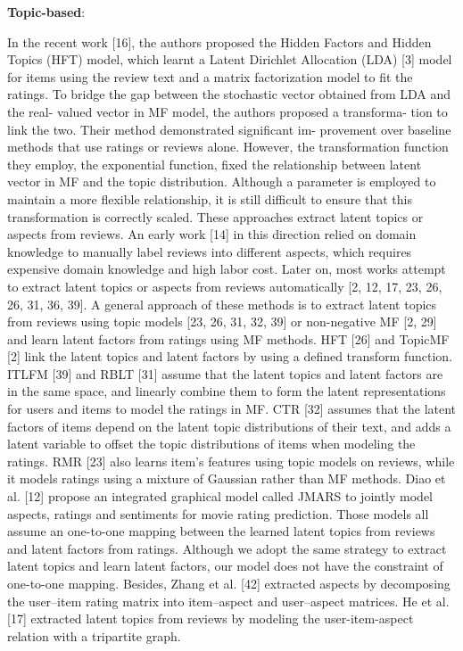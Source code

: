 \documentclass[10pt,conference]{IEEEtran}
\begin{document}
\textbf{Topic-based}: 

In the recent work [16], the authors proposed the Hidden Factors and Hidden Topics (HFT) model, which learnt a Latent Dirichlet Allocation (LDA) [3] model for items using the review text and a matrix factorization model to fit the ratings. To bridge the gap between the stochastic vector obtained from LDA and the real- valued vector in MF model, the authors proposed a transforma- tion to link the two. Their method demonstrated significant im- provement over baseline methods that use ratings or reviews alone. However, the transformation function they employ, the exponential function, fixed the relationship between latent vector in MF and the topic distribution. Although a parameter is employed to maintain a more flexible relationship, it is still difficult to ensure that this transformation is correctly scaled.
These approaches extract latent topics or aspects from reviews. An early work [14] in this direction relied on domain knowledge to manually label reviews into different aspects, which requires expensive domain knowledge and high labor cost. Later on, most works attempt to extract latent topics or aspects from reviews automatically [2, 12, 17, 23, 26, 26, 31, 36, 39]. A general approach of these methods is to extract latent topics from reviews using topic models [23, 26, 31, 32, 39] or non-negative MF [2, 29] and learn latent factors from ratings using MF methods. HFT [26] and TopicMF [2] link the latent topics and latent factors by using a defined transform function. ITLFM [39] and RBLT [31] assume that the latent topics and latent factors are in the same space, and linearly combine them to form the latent representations for users and items to model the ratings in MF. CTR [32] assumes that the latent factors of items depend on the latent topic distributions of their text, and adds a latent variable to offset the topic distributions of items when modeling the ratings. RMR [23] also learns item’s features using topic models on reviews, while it models ratings using a mixture of Gaussian rather than MF methods. Diao et al. [12] propose an integrated graphical model called JMARS to jointly model aspects, ratings and sentiments for movie rating prediction. Those models all assume an one-to-one mapping between the learned latent topics from reviews and latent factors from ratings. Although we adopt the same strategy to extract latent topics and learn latent factors, our model does not have the constraint of one-to-one mapping. Besides, Zhang et al. [42] extracted aspects by decomposing the user–item rating matrix into item–aspect and user–aspect matrices. He et al. [17] extracted latent topics from reviews by modeling the user-item-aspect relation with a tripartite graph.
\end{document}
